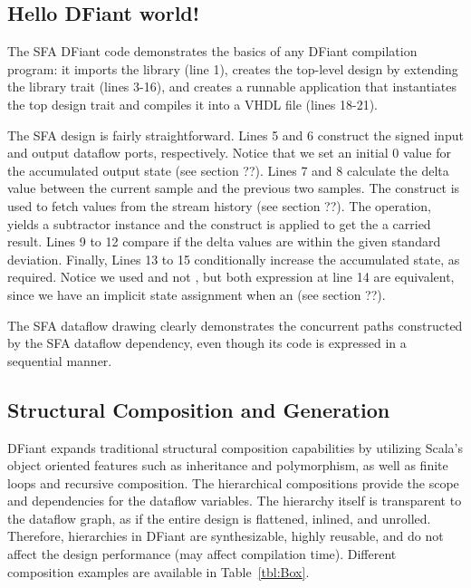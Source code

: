 \subsection{Hello DFiant world!}
The SFA DFiant code demonstrates the basics of any DFiant compilation program: it imports the  library (line 1), creates the top-level design by extending the  library trait (lines 3-16), and creates a runnable application that instantiates the top design trait and compiles it into a VHDL file (lines 18-21). 

The SFA design is fairly straightforward. Lines 5 and 6 construct the signed input and output dataflow ports, respectively. Notice that we set an initial 0 value for the accumulated output state (see section ??). Lines 7 and 8 calculate the delta value between the current sample and the previous two samples. The  construct is used to fetch values from the stream history (see section ??). The \code{-} operation, yields a subtractor instance and the  construct is applied to get the a carried result. Lines 9 to 12 compare if the delta values are within the given standard deviation. Finally, Lines 13 to 15 conditionally increase the accumulated state, as required. Notice we used   and not , but both expression at line 14 are equivalent, since we have an implicit state assignment  when an (see section ??). 

The SFA dataflow drawing clearly demonstrates the concurrent paths constructed by the SFA dataflow dependency, even though its code is expressed in a sequential manner.


\subsection{Structural Composition and Generation}

DFiant expands traditional structural composition capabilities by utilizing Scala's object oriented features such as inheritance and polymorphism, as well as finite loops and recursive composition. The hierarchical compositions provide the scope and dependencies for the dataflow variables. The hierarchy itself is transparent to the dataflow graph, as if the entire design is flattened, inlined, and unrolled. Therefore, hierarchies in DFiant are synthesizable, highly reusable, and do not affect the design performance (may affect compilation time). Different composition examples are available in Table~\ref{tbl:Box}.

